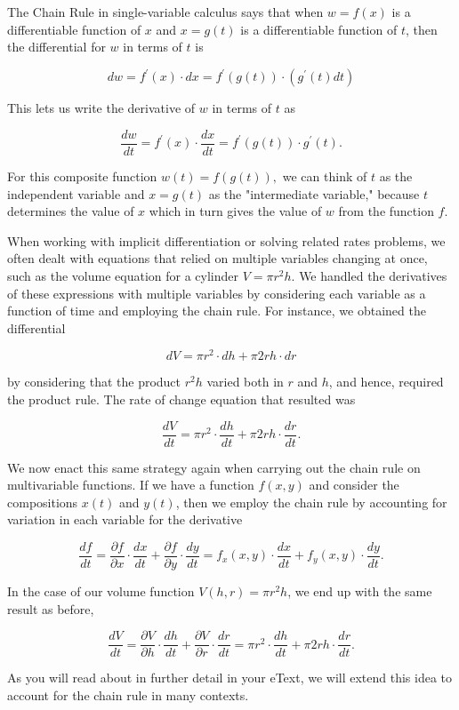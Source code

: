 \documentclass{ximera}
\begin{document}
The Chain Rule in single-variable calculus says that when $w=f(x)$ is a differentiable function of $x$ and $x=g(t)$ is a differentiable function of $t$, then the differential for $w$ in terms of $t$ is

$$dw=f^{\prime}(x)\cdot dx=f^{\prime}(g(t))\cdot(g^{\prime}(t)dt)$$

This lets us write the derivative of $w$ in terms of $t$ as

$$\frac{dw}{dt}=f^{\prime}(x)\cdot\frac{dx}{dt}=f^{\prime}(g(t))\cdot g^{\prime}(t).$$

For this composite function $w(t)=f(g(t)),$ we can think of $t$ as the independent variable and $x=g(t)$ as the "intermediate variable," because $t$ determines the value of $x$ which in turn gives the value of $w$ from the function $f$.

When working with implicit differentiation or solving related rates problems, we often dealt with equations that relied on multiple variables changing at once, such as the volume equation for a cylinder $V=\pi r^2 h$. We handled the derivatives of these expressions with multiple variables by considering each variable as a function of time and employing the chain rule. For instance, we obtained the differential

$$dV=\pi r^2 \cdot dh+\pi 2rh\cdot dr$$

by considering that the product $r^2 h$ varied both in $r$ and $h$, and hence, required the product rule. The rate of change equation that resulted was 

$$\frac{dV}{dt}=\pi r^2 \cdot \frac{dh}{dt}+\pi 2rh\cdot \frac{dr}{dt}.$$

We now enact this same strategy again when carrying out the chain rule on multivariable functions. If we have a function $f(x,y)$ and consider the compositions $x(t)$ and $y(t)$, then we employ the chain rule by accounting for variation in each variable for the derivative

$$\frac{df}{dt}=\frac{\partial f}{\partial x}\cdot \frac{dx}{dt}+\frac{\partial f}{\partial y}\cdot \frac{dy}{dt}=f_x(x,y)\cdot \frac{dx}{dt}+f_y(x,y)\cdot \frac{dy}{dt}.$$

In the case of our volume function $V(h,r)=\pi r^2 h$, we end up with the same result as before, 

$$\frac{dV}{dt}=\frac{\partial V}{\partial h}\cdot \frac{dh}{dt}+\frac{\partial V}{\partial r}\cdot \frac{dr}{dt}=\pi r^2 \cdot \frac{dh}{dt}+\pi 2rh\cdot \frac{dr}{dt}.$$

As you will read about in further detail in your eText, we will extend this idea to account for the chain rule in many contexts.
\end{document}
